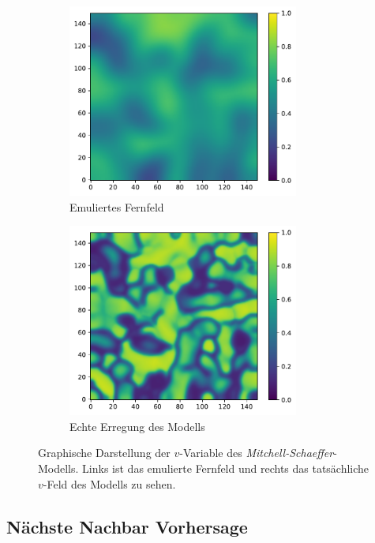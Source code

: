 \begin{figure}[h]
	\centering
	\begin{subfigure}{.5\textwidth}
		\centering
		\includegraphics[height=2.5in]{figures/results/unblur/mitchell_v_blur_blured.pdf}
		\setcapmargin[1cm]{1cm}
		\caption{Emuliertes Fernfeld}
		\label{fig:exp_unblur_mitchell_schaeffer_blurred}
	\end{subfigure}%
	\begin{subfigure}{.5\textwidth}
		\centering
		\includegraphics[height=2.5in]{figures/results/unblur/mitchell_v_blur_orig.pdf}
		\setcapmargin[1cm]{1cm}
  		\caption{Echte Erregung des Modells}
  		\label{fig:exp_unblur_mitchell_schaeffer_orig}
	\end{subfigure}
	\caption{Graphische Darstellung der $v$-Variable des \textit{Mitchell-Schaeffer}-Modells. Links ist das emulierte Fernfeld und rechts das tatsächliche $v$-Feld des Modells zu sehen.}
	\label{fig:exp_unblur_mitchell_schaeffer}
\end{figure} 

\subsection{Nächste Nachbar Vorhersage}

